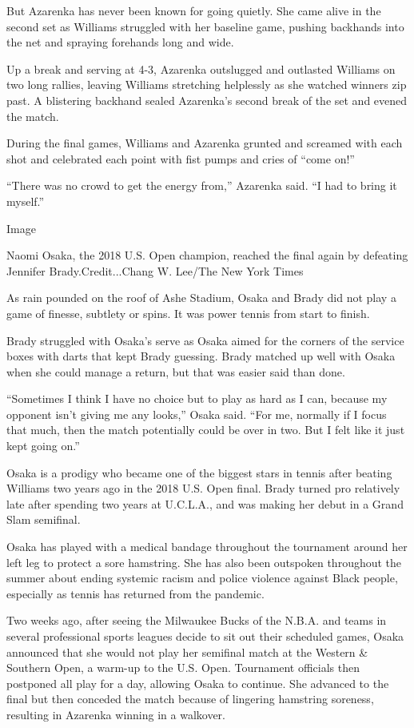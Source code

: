 But Azarenka has never been known for going quietly. She came alive in
the second set as Williams struggled with her baseline game, pushing
backhands into the net and spraying forehands long and wide.

Up a break and serving at 4-3, Azarenka outslugged and outlasted
Williams on two long rallies, leaving Williams stretching helplessly as
she watched winners zip past. A blistering backhand sealed Azarenka's
second break of the set and evened the match.

During the final games, Williams and Azarenka grunted and screamed with
each shot and celebrated each point with fist pumps and cries of ``come
on!''

``There was no crowd to get the energy from,'' Azarenka said. ``I had to
bring it myself.''

Image

Naomi Osaka, the 2018 U.S. Open champion, reached the final again by
defeating Jennifer Brady.Credit...Chang W. Lee/The New York Times

As rain pounded on the roof of Ashe Stadium, Osaka and Brady did not
play a game of finesse, subtlety or spins. It was power tennis from
start to finish.

Brady struggled with Osaka's serve as Osaka aimed for the corners of the
service boxes with darts that kept Brady guessing. Brady matched up well
with Osaka when she could manage a return, but that was easier said than
done.

``Sometimes I think I have no choice but to play as hard as I can,
because my opponent isn't giving me any looks,'' Osaka said. ``For me,
normally if I focus that much, then the match potentially could be over
in two. But I felt like it just kept going on.''

Osaka is a prodigy who became one of the biggest stars in tennis after
beating Williams two years ago in the 2018 U.S. Open final. Brady turned
pro relatively late after spending two years at U.C.L.A., and was making
her debut in a Grand Slam semifinal.

Osaka has played with a medical bandage throughout the tournament around
her left leg to protect a sore hamstring. She has also been outspoken
throughout the summer about ending systemic racism and police violence
against Black people, especially as tennis has returned from the
pandemic.

Two weeks ago, after seeing the Milwaukee Bucks of the N.B.A. and teams
in several professional sports leagues decide to sit out their scheduled
games, Osaka announced that she would not play her semifinal match at
the Western \& Southern Open, a warm-up to the U.S. Open. Tournament
officials then postponed all play for a day, allowing Osaka to continue.
She advanced to the final but then conceded the match because of
lingering hamstring soreness, resulting in Azarenka winning in a
walkover.


